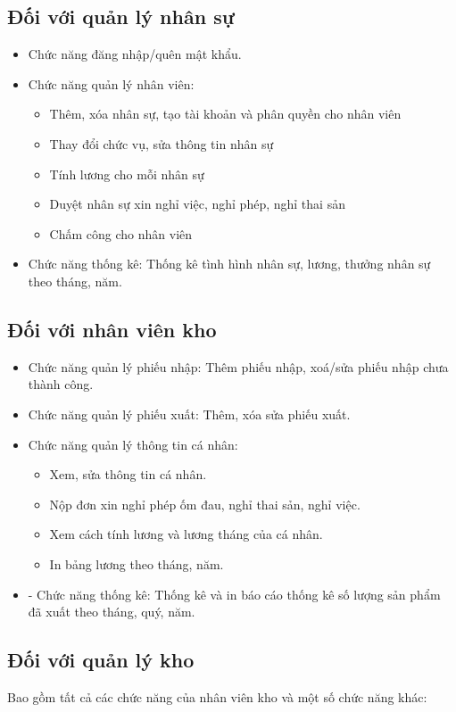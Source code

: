 \documentclass[a4paper,12pt]{report}
\begin{document}
\subsection{Đối với quản lý nhân sự}
\begin{itemize}
    \item Chức năng đăng nhập/quên mật khẩu.
    \item Chức năng quản lý nhân viên:
          \begin{itemize}
              \item Thêm, xóa nhân sự, tạo tài khoản và phân quyền cho nhân viên
              \item Thay đổi chức vụ, sửa thông tin nhân sự
              \item Tính lương cho mỗi nhân sự
              \item Duyệt nhân sự xin nghỉ việc, nghỉ phép, nghỉ thai sản
              \item Chấm công cho nhân viên
          \end{itemize}
    \item Chức năng thống kê: Thống kê tình hình nhân sự, lương, thưởng nhân sự theo tháng, năm.
\end{itemize}
\subsection{Đối với nhân viên kho}
\begin{itemize}
    \item Chức năng quản lý phiếu nhập: Thêm phiếu nhập, xoá/sửa phiếu nhập chưa thành công.
    \item Chức năng quản lý phiếu xuất: Thêm, xóa sửa phiếu xuất.
    \item Chức năng quản lý thông tin cá nhân:
          \begin{itemize}
              \item Xem, sửa thông tin cá nhân.
              \item Nộp đơn xin nghỉ phép ốm đau, nghỉ thai sản, nghỉ việc.
              \item Xem cách tính lương và lương tháng của cá nhân.
              \item In bảng lương theo tháng, năm.
          \end{itemize}
    \item -	Chức năng thống kê: Thống kê và in báo cáo thống kê số lượng sản phẩm đã xuất theo tháng, quý, năm.
\end{itemize}
\subsection{Đối với quản lý kho}
\quad Bao gồm tất cả các chức năng của nhân viên kho và một số chức năng khác:
\end{document}

